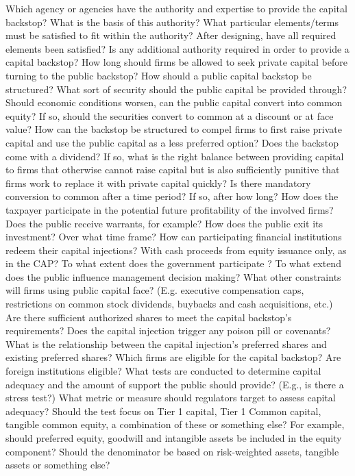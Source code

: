 \documentclass[12pt]{article}
\begin{document}
\begin{outline}[enumerate]

\1 Which agency or agencies have the authority and expertise to provide the capital backstop?
\2 What is the basis of this authority?
\2 What particular elements/terms must be satisfied to fit within the authority?
\2 After designing, have all required elements been satisfied?
\2 Is any additional authority required in order to provide a capital backstop?
\2 How long should firms be allowed to seek private capital before turning to the public backstop?
\1 How should a public capital backstop be structured?
\2 What sort of security should the public capital be provided through?
\2 Should economic conditions worsen, can the public capital convert into common equity?
\3 If so, should the securities convert to common at a discount or at face value?
\2 How can the backstop be structured to compel firms to first raise private capital and use the public capital as a less preferred option?
\2 Does the backstop come with a dividend? If so, what is the right balance between providing capital to firms that otherwise cannot raise capital but is also sufficiently punitive that firms work to replace it with private capital quickly?
\2 Is there mandatory conversion to common after a time period? If so, after how long?
\2 How does the taxpayer participate in the potential future profitability of the involved firms? Does the public receive warrants, for example?
\2 How does the public exit its investment? Over what time frame? 
\2 How can participating financial institutions redeem their capital injections? With cash proceeds from equity issuance only, as in the CAP? 
\1 To what extent does the government participate ?
\2 To what extend does the public influence management decision making?
\2 What other constraints will firms using public capital face? (E.g. executive compensation caps, restrictions on common stock dividends, buybacks and cash acquisitions, etc.)
\2 Are there sufficient authorized shares to meet the capital backstop's requirements?
\2 Does the capital injection trigger any poison pill or covenants?
\2 What is the relationship between the capital injection's preferred shares and existing preferred shares? 
\1 Which firms are eligible for the capital backstop? 
\2 Are foreign institutions eligible?
\2 What tests are conducted to determine capital adequacy and the amount of support the public should provide? (E.g., is there a stress test?)
\2 What metric or measure should regulators target to assess capital adequacy?
\3 Should the test focus on Tier 1 capital, Tier 1 Common capital, tangible common equity, a combination of these or something else?
\4 For example, should preferred equity, goodwill and intangible assets be included in the equity component?
\4 Should the denominator be based on risk-weighted assets, tangible assets or something else?

\end{outline}
\end{document}
